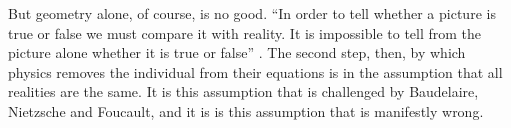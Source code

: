 %


But geometry alone, of course, is no good. %
``In order to tell whether a picture is true or false we must compare
it with reality.  It is impossible to tell from the picture alone
whether it is true or false'' \cite[2.223, 2.224]{WittgensteinBook}.
The second step, then, by which physics removes the individual from their
equations is in the assumption that all realities are the same.
It is this assumption that is challenged by Baudelaire, Nietzsche  and
Foucault,
and it is is this assumption that is manifestly wrong.

